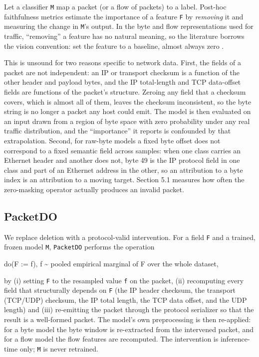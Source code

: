 \documentclass[journal]{IEEEtran}
\begin{document}
Let a classifier \texttt{M} map a packet (or a flow of packets) to a
label. Post-hoc faithfulness metrics estimate the importance of a
feature \texttt{F} by \emph{removing} it and measuring the change in
\texttt{M}'s output. In the byte and flow representations used for
traffic, ``removing'' a feature has no natural meaning, so the
literature borrows the vision convention: set the feature to a baseline,
almost always zero \cite{zeiler2014visualizing,samek2017evaluating}.

This is unsound for two reasons specific to network data. First, the
fields of a packet are not independent: an IP or transport checksum is a
function of the other header and payload bytes, and the IP total-length
and TCP data-offset fields are functions of the packet's structure.
Zeroing any field that a checksum covers, which is almost all of them,
leaves the checksum inconsistent, so the byte string is no longer a
packet any host could emit. The model is then evaluated on an input
drawn from a region of byte space with zero probability under any real
traffic distribution, and the ``importance'' it reports is confounded by
that extrapolation. Second, for raw-byte models a fixed byte offset does
not correspond to a fixed semantic field across samples: when one class
carries an Ethernet header and another does not, byte 49 is the IP
protocol field in one class and part of an Ethernet address in the
other, so an attribution to a byte index is an attribution to a moving
target. Section 5.1 measures how often the zero-masking operator
actually produces an invalid packet.

\subsection{PacketDO}

We replace deletion with a protocol-valid intervention. For a field
\texttt{F} and a trained, frozen model \texttt{M}, \texttt{PacketDO}
performs the operation

do(F := f), f \textasciitilde{} pooled empirical marginal of F over the
whole dataset,

by (i) setting \texttt{F} to the resampled value \texttt{f} on the
packet, (ii) recomputing every field that structurally depends on
\texttt{F} (the IP header checksum, the transport (TCP/UDP) checksum,
the IP total length, the TCP data offset, and the UDP length) and (iii)
re-emitting the packet through the protocol serializer \cite{scapy} so
that the result is a well-formed packet. The model's own preprocessing
is then re-applied: for a byte model the byte window is re-extracted
from the intervened packet, and for a flow model the flow features are
recomputed. The intervention is inference-time only; \texttt{M} is never
retrained.
\end{document}
